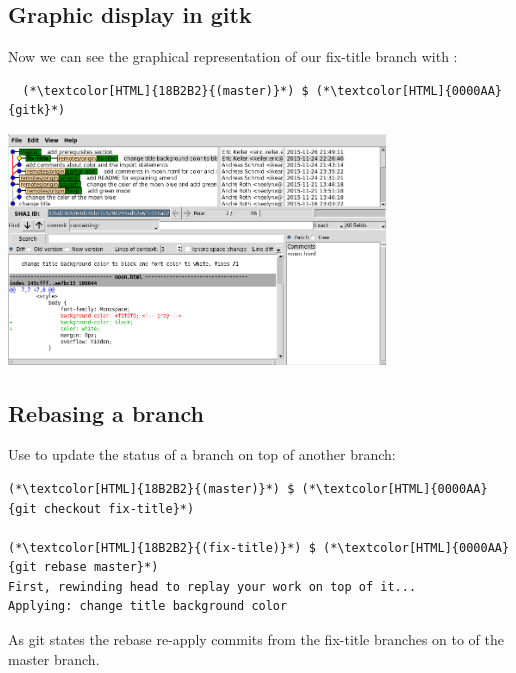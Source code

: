 \subsection{Graphic display in gitk}
\begin{frame}[fragile]
  \subslidetitle

  Now we can see the graphical representation of our fix-title branch with :
  \begin{lstlisting}
  (*\textcolor[HTML]{18B2B2}{(master)}*) $ (*\textcolor[HTML]{0000AA}{gitk}*)
\end{lstlisting}

  \vspace{1em}

  \centerline{\includegraphics[width=10cm]{../screen/gitk-fix-title.png}}

\end{frame}

\subsection{Rebasing a branch}
\begin{frame}[fragile]
  \subslidetitle

  Use  to update the status of a branch on top of another branch:

  \begin{lstlisting}
(*\textcolor[HTML]{18B2B2}{(master)}*) $ (*\textcolor[HTML]{0000AA}{git checkout fix-title}*)

(*\textcolor[HTML]{18B2B2}{(fix-title)}*) $ (*\textcolor[HTML]{0000AA}{git rebase master}*)
First, rewinding head to replay your work on top of it...
Applying: change title background color
\end{lstlisting}

  As git states the rebase re-apply commits from the fix-title branches on to of the master branch.

\end{frame}

